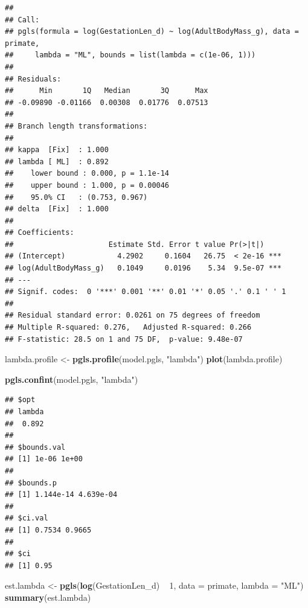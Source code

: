 \documentclass[]{article}
\newenvironment{Shaded}{\begin{snugshade}}{\end{snugshade}}
\newcommand{\KeywordTok}[1]{\textcolor[rgb]{0.13,0.29,0.53}{\textbf{{#1}}}}
\newcommand{\DataTypeTok}[1]{\textcolor[rgb]{0.13,0.29,0.53}{{#1}}}
\newcommand{\DecValTok}[1]{\textcolor[rgb]{0.00,0.00,0.81}{{#1}}}
\newcommand{\StringTok}[1]{\textcolor[rgb]{0.31,0.60,0.02}{{#1}}}
\newcommand{\NormalTok}[1]{{#1}}
\begin{document}
\begin{verbatim}
## 
## Call:
## pgls(formula = log(GestationLen_d) ~ log(AdultBodyMass_g), data = primate, 
##     lambda = "ML", bounds = list(lambda = c(1e-06, 1)))
## 
## Residuals:
##      Min       1Q   Median       3Q      Max 
## -0.09890 -0.01166  0.00308  0.01776  0.07513 
## 
## Branch length transformations:
## 
## kappa  [Fix]  : 1.000
## lambda [ ML]  : 0.892
##    lower bound : 0.000, p = 1.1e-14
##    upper bound : 1.000, p = 0.00046
##    95.0% CI   : (0.753, 0.967)
## delta  [Fix]  : 1.000
## 
## Coefficients:
##                      Estimate Std. Error t value Pr(>|t|)    
## (Intercept)            4.2902     0.1604   26.75  < 2e-16 ***
## log(AdultBodyMass_g)   0.1049     0.0196    5.34  9.5e-07 ***
## ---
## Signif. codes:  0 '***' 0.001 '**' 0.01 '*' 0.05 '.' 0.1 ' ' 1
## 
## Residual standard error: 0.0261 on 75 degrees of freedom
## Multiple R-squared: 0.276,   Adjusted R-squared: 0.266 
## F-statistic: 28.5 on 1 and 75 DF,  p-value: 9.48e-07
\end{verbatim}

\begin{Shaded}
\begin{Highlighting}[]
\NormalTok{lambda.profile <-}\StringTok{ }\KeywordTok{pgls.profile}\NormalTok{(model.pgls, }\StringTok{"lambda"}\NormalTok{)}
\KeywordTok{plot}\NormalTok{(lambda.profile)}
\end{Highlighting}
\end{Shaded}

\begin{Shaded}
\begin{Highlighting}[]
\KeywordTok{pgls.confint}\NormalTok{(model.pgls, }\StringTok{"lambda"}\NormalTok{)}
\end{Highlighting}
\end{Shaded}

\begin{verbatim}
## $opt
## lambda 
##  0.892 
## 
## $bounds.val
## [1] 1e-06 1e+00
## 
## $bounds.p
## [1] 1.144e-14 4.639e-04
## 
## $ci.val
## [1] 0.7534 0.9665
## 
## $ci
## [1] 0.95
\end{verbatim}

\begin{Shaded}
\begin{Highlighting}[]
\NormalTok{est.lambda <-}\StringTok{ }\KeywordTok{pgls}\NormalTok{(}\KeywordTok{log}\NormalTok{(GestationLen_d) ~}\StringTok{ }\DecValTok{1}\NormalTok{, }\DataTypeTok{data =} \NormalTok{primate, }\DataTypeTok{lambda =} \StringTok{"ML"}\NormalTok{)}
\KeywordTok{summary}\NormalTok{(est.lambda)}
\end{Highlighting}
\end{Shaded}
\end{document}
